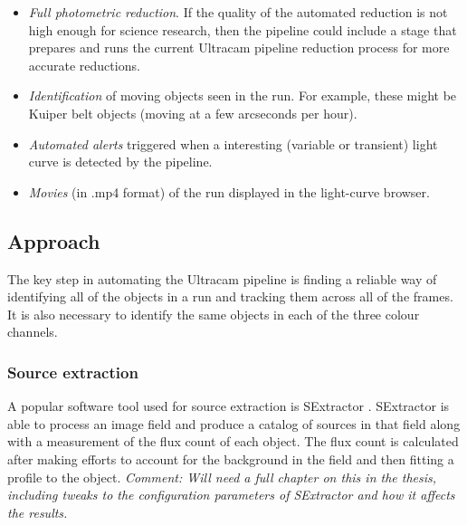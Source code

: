 \begin{itemize}
	\item \emph{Full photometric reduction}. If the quality of the automated reduction is not high enough for science research, then the pipeline could include a stage that prepares and runs the current Ultracam pipeline reduction process for more accurate reductions.
	\item \emph{Identification} of moving objects seen in the run. For example, these might be Kuiper belt objects (moving at a few arcseconds per hour).
	\item \emph{Automated alerts} triggered when a interesting (variable or transient) light curve is detected by the pipeline. 
	\item \emph{Movies} (in .mp4 format) of the run displayed in the light-curve browser. 
\end{itemize}

\subsection{Approach}
The key step in automating the Ultracam pipeline is finding a reliable way of identifying all of the objects in a run and tracking them across all of the frames. It is also necessary to identify the same objects in each of the three colour channels. 

\subsubsection{Source extraction}
A popular software tool used for source extraction is SExtractor \cite{bertin}. SExtractor is able to process an image field and produce a catalog of sources in that field along with a measurement of the flux count of each object. The flux count is calculated after making efforts to account for the background in the field and then fitting a profile to the object. \emph{Comment: Will need a full chapter on this in the thesis, including tweaks to the configuration parameters of SExtractor and how it affects the results.}

